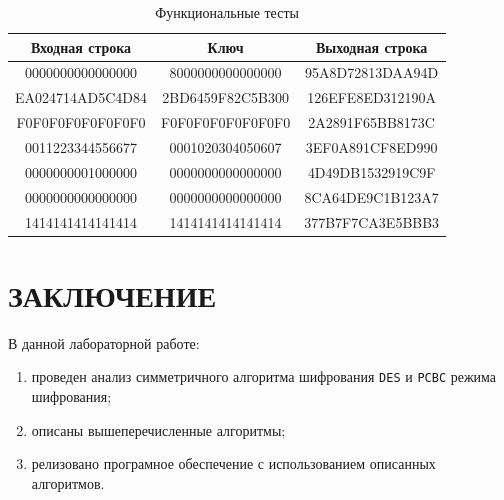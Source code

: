 \begin{table}[ht!]
	\begin{center}
		\captionsetup{justification=raggedright,singlelinecheck=off}
		\caption{\label{tbl:functional_test} Функциональные тесты}
		\begin{tabular}{|c|c|c|}
			\hline
			Входная строка & Ключ & Выходная строка \\ 
			\hline
			0000000000000000 & 8000000000000000 & 95A8D72813DAA94D \\
                        EA024714AD5C4D84 & 2BD6459F82C5B300 & 126EFE8ED312190A \\
			F0F0F0F0F0F0F0F0 & F0F0F0F0F0F0F0F0 & 2A2891F65BB8173C \\
                        0011223344556677 & 0001020304050607 & 3EF0A891CF8ED990 \\
      0000000001000000 & 0000000000000000 & 4D49DB1532919C9F \\
                        0000000000000000 & 0000000000000000 & 8CA64DE9C1B123A7 \\
      1414141414141414 & 1414141414141414 & 377B7F7CA3E5BBB3 \\
			\hline
		\end{tabular}
	\end{center}
\end{table}

\clearpage
\section*{\large{ЗАКЛЮЧЕНИЕ}}
В данной лабораторной работе:

\begin{enumerate}
    \item проведен анализ симметричного алгоритма шифрования \texttt{DES} и \texttt{PCBC} режима шифрования;
    \item описаны вышеперечисленные алгоритмы;
    \item релизовано програмное обеспечение с использованием описанных алгоритмов.
\end{enumerate}
